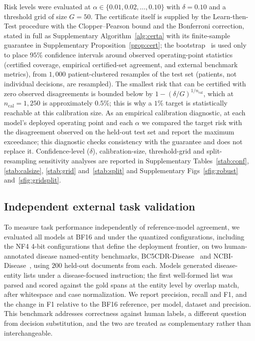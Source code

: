 \documentclass[pdflatex,sn-mathphys-num]{sn-jnl}%
\theoremstyle{thmstyleone}%
\theoremstyle{thmstyletwo}%
\theoremstyle{thmstylethree}%
\begin{document}
Risk levels were evaluated at $\alpha\in\{0.01,0.02,\dots,0.10\}$ with $\delta=0.10$ and a
threshold grid of size $G=50$. The certificate itself is supplied by the Learn-then-Test procedure
with the Clopper--Pearson bound and the Bonferroni correction, stated in full as Supplementary
Algorithm~\ref{alg:certa} with its finite-sample guarantee in Supplementary
Proposition~\ref{prop:cert}; the bootstrap~\cite{efron1979bootstrap} is used only to place
$95\%$ confidence intervals around observed operating-point statistics (certified coverage,
empirical certified-set agreement, and external benchmark metrics), from $1{,}000$ patient-clustered
resamples of the test set (patients, not individual decisions, are resampled). The smallest risk that can be certified with zero observed disagreements is bounded below
by $1-(\delta/G)^{1/n_{\mathrm{cal}}}$, which at $n_{\mathrm{cal}}=1{,}250$ is approximately
$0.5\%$; this is why a $1\%$ target is statistically reachable at this calibration size. As an
empirical calibration diagnostic, at each model's deployed operating point and each $\alpha$ we
compared the target risk with the disagreement observed on the held-out test set and report the
maximum exceedance; this diagnostic checks consistency with the guarantee and does not replace it.
Confidence-level ($\delta$), calibration-size, threshold-grid and split-resampling sensitivity
analyses are reported in Supplementary Tables~\ref{stab:conf}, \ref{stab:calsize}, \ref{stab:grid}
and~\ref{stab:split} and Supplementary Figs~\ref{sfig:robust} and~\ref{sfig:gridsplit}.
 
\subsection*{Independent external task validation}
 
To measure task performance independently of reference-model agreement, we evaluated all models at
BF16 and under the quantized configurations, including the NF4 4-bit configurations that
define the deployment frontier, on two human-annotated disease named-entity benchmarks,
BC5CDR-Disease~\cite{li2016bc5cdr} and NCBI-Disease~\cite{dogan2014ncbi}, using $200$ held-out documents from each. Models generated
disease-entity lists under a disease-focused instruction; the first well-formed list was parsed and
scored against the gold spans at the entity level by overlap match, after whitespace and case
normalization. We report precision, recall and F1, and the change in F1 relative to the
BF16 reference, per model, dataset and precision. This benchmark addresses correctness
against human labels, a different question from decision substitution, and the two are treated as
complementary rather than interchangeable.
 
\end{document}
